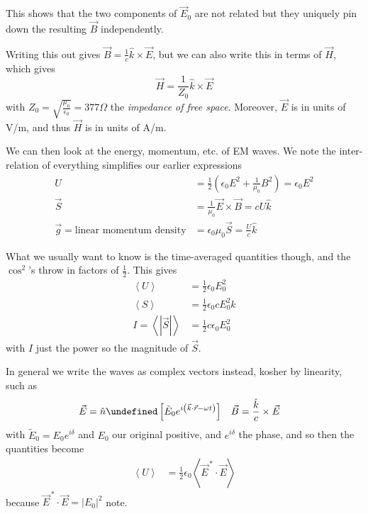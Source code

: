\documentclass[10pt]{report}
\let\Re\undefined
\DeclareMathOperator{\Re}{Re}
\newcommand{\expvalue}[1]{\left<#1\right>}
\newcommand{\abs}[1]{\left|#1\right|}
\begin{document}
This shows that the two components of $\vec{E}_0$ are not related but they uniquely pin down the resulting $\vec{B}$ independently.

Writing this out gives $\vec{B} = \frac{1}{c}\hat{k} \times \vec{E}$, but we can also write this in terms of $\vec{H}$, which gives
\begin{equation}
    \vec{H} = \frac{1}{Z_0}\hat{k} \times \vec{E}
\end{equation}
with $Z_0 = \sqrt{\frac{\mu_0}{\epsilon_0}} = 377 \Omega$ the \emph{impedance of free space}. Moreover, $\vec{E}$ is in units of V/m, and thus $\vec{H}$ is in units of A/m. 

We can then look at the energy, momentum, etc. of EM waves. We note the inter-relation of everything simplifies our earlier expressions
\begin{align}
    U &= \frac{1}{2}\left( \epsilon_0 E^2 + \frac{1}{\mu_0}B^2 \right) = \epsilon_0 E^2\\
    \vec{S} &= \frac{1}{\mu_0} \vec{E} \times \vec{B} = cU\hat{k}\\
    \vec{g} = \text{linear momentum density} &= \epsilon_0 \mu_0 \vec{S} = \frac{U}{c}\hat{k}
\end{align}

What we usually want to know is the time-averaged quantities though, and the $\cos^2$'s throw in factors of $\frac{1}{2}$. This gives
\begin{align}
    \expvalue{U} &= \frac{1}{2}\epsilon_0 E_0^2\\
    \expvalue{S} &= \frac{1}{2}\epsilon_0 cE_0^2 \hat{k}\\
    I = \expvalue{\abs{\vec{S}}} &= \frac{1}{2}c\epsilon_0 E_0^2
\end{align}
with $I$ just the power so the magnitude of $\vec{S}$.

In general we write the waves as complex vectors instead, kosher by linearity, such as
\begin{align}
    \vec{E} &= \hat{n} \Re\left[ \tilde{E}_0 e^{i\left( \vec{k} \cdot \vec{r} - \omega t \right)} \right] & \vec{B} &= \frac{\hat{k}}{c}\times \vec{E}
\end{align}
with $\tilde{E}_0 = E_0 e^{i\delta}$ and $E_0$ our original positive, and $e^{i\delta}$ the phase, and so then the quantities become
\begin{align}
    \expvalue{U} &= \frac{1}{2}\epsilon_0 \expvalue{\vec{E}^{\, *} \cdot \vec{E}}
\end{align}
because $\vec{E}^{\,*}\cdot \vec{E} = \abs{E_0}^2$ note. 
\end{document}
